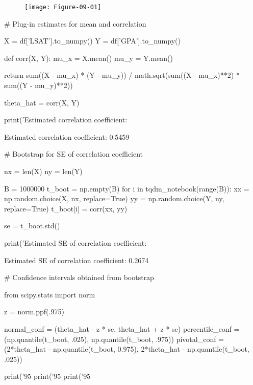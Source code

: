 \begin{figure}[H]
\centering
\texttt{[image: Figure-09-01]}
\end{figure}

\begin{python}
# Plug-in estimates for mean and correlation

X = df['LSAT'].to_{n}umpy()
Y = df['GPA'].to_{n}umpy()

def corr(X, Y):
    mu_x = X.mean()
    mu_y = Y.mean()

    return sum((X - mu_x) * (Y - mu_y)) / math.sqrt(sum((X - mu_x)**2) * sum((Y - mu_y)**2))
  

theta_hat = corr(X, Y)
    
print('Estimated correlation coefficient: %
\end{python}

\begin{console}
Estimated correlation coefficient: 0.5459
\end{console}

\begin{python}
# Bootstrap for SE of correlation coefficient

nx = len(X)
ny = len(Y)

B = 1000000
t_boot = np.empty(B)
for i in tqdm_{n}otebook(range(B)):
    xx = np.random.choice(X, nx, replace=True)
    yy = np.random.choice(Y, ny, replace=True)
    t_boot[i] = corr(xx, yy)
    
se = t_boot.std()

print('Estimated SE of correlation coefficient: %
\end{python}


\begin{console}
Estimated SE of correlation coefficient: 0.2674
\end{console}

\begin{python}
# Confidence intervals obtained from bootstrap

from scipy.stats import norm

z = norm.ppf(.975)

normal_conf = (theta_hat - z * se, theta_hat + z * se)
percentile_conf = (np.quantile(t_boot, .025), np.quantile(t_boot, .975))
pivotal_conf = (2*theta_hat - np.quantile(t_boot, 0.975), 2*theta_hat - np.quantile(t_boot, .025))

print('95%
print('95%
print('95%
\end{python}

